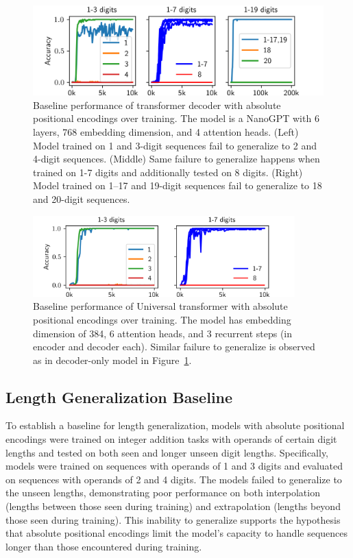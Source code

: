 \begin{figure}[!h]
    \centering
    \includegraphics[width=\textwidth]{fig/baseline_and_longer.png}
    \caption{Baseline performance of transformer decoder with absolute positional encodings over training. The model is a NanoGPT with 6 layers, 768 embedding dimension, and 4 attention heads. (Left) Model trained on 1 and 3-digit sequences fail to generalize to 2 and 4-digit sequences. (Middle) Same failure to generalize happens when trained on 1-7 digits and additionally tested on 8 digits. (Right) Model trained on 1--17 and 19-digit sequences fail to generalize to 18 and 20-digit sequences.}
    \label{fig:baseline_and_longer}
\end{figure}

\begin{figure}[!h]
    \centering
    \includegraphics[width=0.9\textwidth]{fig/baseline_and_longer_ut.png}
    \caption{Baseline performance of Universal transformer with absolute positional encodings over training. The model has embedding dimension of 384, 6 attention heads, and 3 recurrent steps (in encoder and decoder each). Similar failure to generalize is observed as in decoder-only model in Figure~\ref{fig:baseline_and_longer}.}
    \label{fig:baseline_and_longer_ut}
\end{figure}

\subsection{Length Generalization Baseline}\label{subsec:length_generalization_baseline}

To establish a baseline for length generalization, models with absolute positional encodings were trained on integer addition tasks with operands of certain digit lengths and tested on both seen and longer unseen digit lengths. Specifically, models were trained on sequences with operands of 1 and 3 digits and evaluated on sequences with operands of 2 and 4 digits. The models failed to generalize to the unseen lengths, demonstrating poor performance on both interpolation (lengths between those seen during training) and extrapolation (lengths beyond those seen during training). This inability to generalize supports the hypothesis that absolute positional encodings limit the model's capacity to handle sequences longer than those encountered during training.

